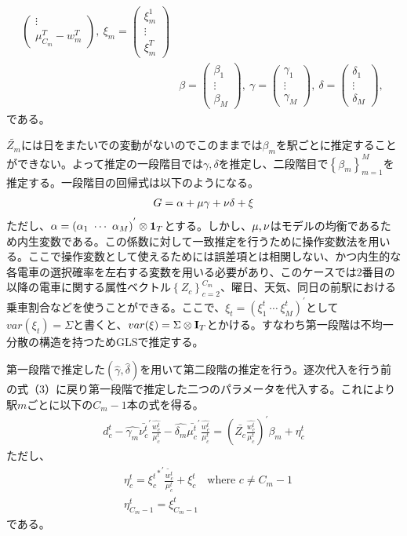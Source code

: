 \documentclass{jsarticle}
\begin{document}
\begin{align*}
\begin{pmatrix}
	\vdots\\
	\mu_{C_m}^T - w_m^T\end{pmatrix},\ \xi_m = \begin{pmatrix} \xi_m^1\\
	\vdots\\
	\xi_m^T \end{pmatrix}\\[8pt]
	&\beta = \begin{pmatrix}\beta_1\\
	\vdots\\
	\beta_M\end{pmatrix},\ \gamma = \begin{pmatrix}\gamma_1\\
	\vdots\\
	\gamma_M\end{pmatrix},\ \delta = \begin{pmatrix}\delta_1\\
	\vdots\\
	\delta_M\end{pmatrix},\
\end{align*}
である。

$\tilde{Z_m}$には日をまたいでの変動がないのでこのままでは$\beta_m$を駅ごとに推定することができない。よって推定の一段階目では$\gamma, \delta$を推定し、二段階目で$\left\{ \beta_m \right\}_{m = 1}^{M}$を推定する。一段階目の回帰式は以下のようになる。
\begin{align*}
	G = \alpha + {\bf \mu} \gamma + {\bf \nu} \delta + \xi
\end{align*}
ただし、$\alpha = \left( \alpha_1\ \cdots\ \alpha_M \right)^{'} \otimes {\bf 1}_T$とする。しかし、${\bf \mu}, {\bf \nu}$はモデルの均衡であるため内生変数である。この係数に対して一致推定を行うために操作変数法を用いる。ここで操作変数として使えるためには誤差項とは相関しない、かつ内生的な各電車の選択確率を左右する変数を用いる必要があり、このケースでは2番目の以降の電車に関する属性ベクトル$\left\{ Z_c \right\}_{c = 2}^{C_m}$、曜日、天気、同日の前駅における乗車割合などを使うことができる。ここで、$\xi_t = \left( \xi_1^t\ \cdots\ \xi_M^t \right)^{'}$として$var(\xi_t) = \Sigma$と書くと、$var(\xi) = \Sigma \otimes {\bf I}_T$とかける。すなわち第一段階は不均一分散の構造を持つためGLSで推定する。

第一段階で推定した$\left( \hat{\gamma}, \hat{\delta} \right)$を用いて第二段階の推定を行う。逐次代入を行う前の式（3）に戻り第一段階で推定した二つのパラメータを代入する。これにより駅$m$ごとに以下の$C_m-1$本の式を得る。
\begin{align*}
	d_c^t - \hat{\gamma_m} \bar{\nu_c^t}^{'} \frac{\hat{w_c^t}}{\mu_c^t} - \hat{\delta_m} \bar{\mu_c^t}^{'} \frac{\hat{w_c^t}}{\mu_c^t} = \left( \bar{Z_c} \frac{\hat{w_c^t}}{\mu_c^t}\right)^{'} \beta_m + \eta_c^t
\end{align*}
ただし、
\begin{align*}
	&\eta_c^t = {{\xi_c^t}^{*}}^{'} \frac{\tilde{w_c^t}}{\mu_c^t} + \xi_c^t\quad \text{where $c \neq C_m-1$}\\[8pt]
	&\eta_{C_m-1}^t = \xi_{C_m-1}^t\quad 
\end{align*}
である。
\end{document}
